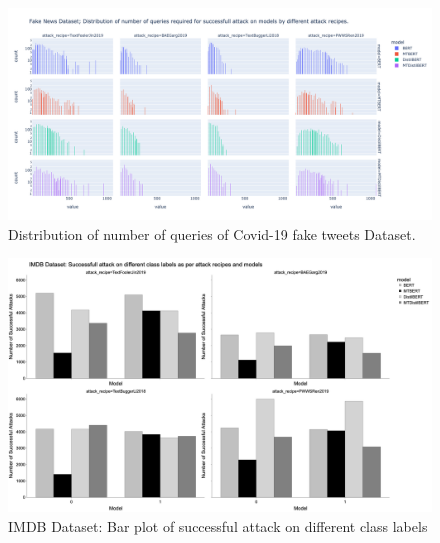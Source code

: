 \documentclass[%
	BCOR=8mm, %
	DIV=12,
	toc=bibliography, %
	toc=listof, %
	oneside, %
	egregdoesnotlikesansseriftitles, %
	]{scrbook}
\begin{document}
\begin{figure}[H]
    \centering
    \includegraphics[width=1.1\linewidth]{img/NumQueriesDist_fknews.png}
    \caption[Distribution of number of queries of Covid-19 fake tweets Dataset]{Distribution of number of queries of Covid-19 fake tweets Dataset.}
    \label{fig:Queries_distribution_fk}
\end{figure}
\begin{figure}[H]
    \centering
    \includegraphics[width=1.0\linewidth]{img/IMDB_class_attack_1.png}
    \caption[Bar plot of successful attack on different class labels for IMDB dataset]{IMDB Dataset: Bar plot of successful attack on different class labels}
    \label{fig:classattack_imdb}
\end{figure}
\end{document}
